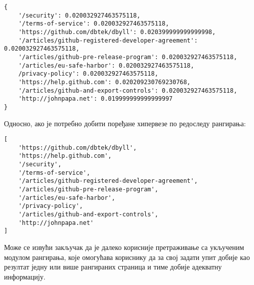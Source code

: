 \begin{lstlisting}
{
    '/security': 0.020032927463575118,
    '/terms-of-service': 0.020032927463575118,
    'https://github.com/dbtek/dbyll': 0.020399999999999998,
    '/articles/github-registered-developer-agreement': 0.020032927463575118,
    '/articles/github-pre-release-program': 0.020032927463575118,
    '/articles/eu-safe-harbor': 0.020032927463575118,
    /privacy-policy': 0.020032927463575118,
    'https://help.github.com': 0.020209230769230768,
    '/articles/github-and-export-controls': 0.020032927463575118,
    'http://johnpapa.net': 0.019999999999999997
}
\end{lstlisting}

Односно, ако је потребно добити поређане хипервезе по редоследу рангирања:

\begin{lstlisting}
[
    'https://github.com/dbtek/dbyll',
    'https://help.github.com',
    '/security',
    '/terms-of-service',
    '/articles/github-registered-developer-agreement',
    '/articles/github-pre-release-program',
    '/articles/eu-safe-harbor',
    '/privacy-policy',
    '/articles/github-and-export-controls',
    'http://johnpapa.net'
]
\end{lstlisting}

Може се извући закључак да је далеко корисније претраживање са укљученим
модулом рангирања, које омогућава кориснику да за свој задати упит добије као
резултат једну или више рангираних страница и тиме добије адекватну
информацију.
